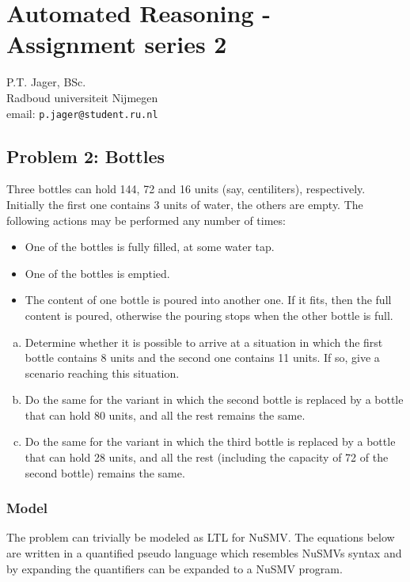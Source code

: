 \documentclass[12pt]{article}
\begin{document}
\section*{Automated Reasoning - Assignment series 2 }

\begin{center}
P.T. Jager, BSc. \\
Radboud universiteit Nijmegen\\
email: {\tt p.jager@student.ru.nl}
\end{center}

\subsection*{Problem 2: Bottles}

Three bottles can hold 144, 72 and 16 units (say, centiliters), respectively.
Initially the first one contains 3 units of water, the others are empty. 
The following actions may be performed any number of times:

\begin{itemize}
    \item One of the bottles is fully filled, at some water tap.
    \item One of the bottles is emptied.
    \item The content of one bottle is poured into another one. If it fits, 
            then the full content is poured, otherwise the pouring stops when 
            the other bottle is full.
\end{itemize}

\begin{enumerate}[(a)]
    \item Determine whether it is possible to arrive at a situation in which 
    the first bottle contains 8 units and the second one contains 11 units. If 
    so, give a scenario reaching this situation.
    \item Do the same for the variant in which the second bottle is replaced by 
    a bottle that can hold 80 units, and all the rest remains the same.
    \item Do the same for the variant in which the third bottle is replaced by a
    bottle that can hold 28 units, and all the rest (including the capacity of 
    72 of the second bottle) remains the same.
\end{enumerate}

\subsubsection*{Model}
The problem can trivially be modeled as LTL for NuSMV. The equations below are 
written in a quantified pseudo language which resembles NuSMVs syntax and by 
expanding the quantifiers can be expanded to a NuSMV program. 
\end{document}
